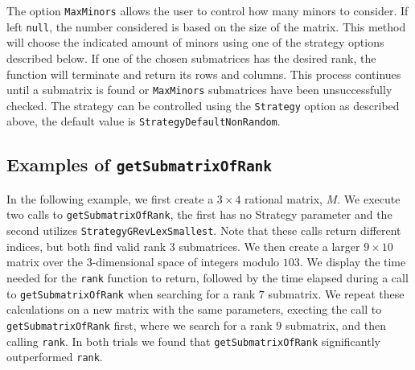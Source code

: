 \documentclass[11pt]{amsart}
\begin{document}
\par The option {\tt MaxMinors} allows the user to control how many minors to consider. If left {\tt null}, 
the number considered is based on the size of the matrix. This method will choose the indicated amount of 
minors using one of the strategy options described below. If one of the chosen submatrices has the desired 
rank, the function will terminate and return its rows and columns. This process continues until a submatrix 
is found or {\tt MaxMinors} submatrices have been unsuccessfully checked.  The strategy can be controlled using the {\tt Strategy} option as described above, the default value is {\tt  StrategyDefaultNonRandom}.


\subsection{Examples of {\tt getSubmatrixOfRank}}
In the following example, we first create a $3 \times 4$ rational matrix, $M$. We execute two calls 
to {\tt getSubmatrixOfRank}, the first has no Strategy parameter and the second utilizes 
{\tt StrategyGRevLexSmallest}. Note that these calls return different indices, but both find 
valid rank $3$ submatrices. We then create a larger $9 \times 10$ matrix over the $3$-dimensional 
space of integers modulo $103$. We display the time needed for the {\tt rank} function to return, 
followed by the time elapsed during a call to {\tt getSubmatrixOfRank} when searching for a rank $7$
submatrix. We repeat these calculations on a new matrix with the same parameters, execting the call
to {\tt getSubmatrixOfRank} first, where we search for a rank $9$ submatrix, and then calling 
{\tt rank}. In both trials we found that {\tt getSubmatrixOfRank} significantly outperformed {\tt rank}. 
\end{document}

